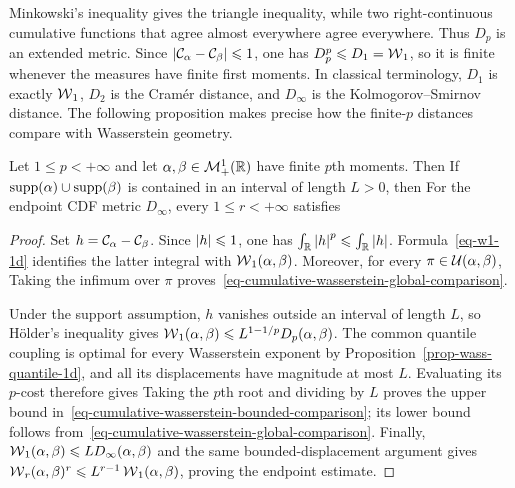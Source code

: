 Minkowski's inequality gives the triangle inequality, while two right-continuous cumulative functions that agree almost everywhere agree everywhere. Thus $D_p$ is an extended metric. Since $\left\lvert\mathcal{C}_{\alpha}-\mathcal{C}_{\beta}\right\rvert\leqslant1$, one has $D_p^p\leqslant D_1=\operatorname{\mathcal{W}}_1$, so it is finite whenever the measures have finite first moments. In classical terminology, $D_1$ is exactly $\operatorname{\mathcal{W}}_1$, $D_2$ is the Cram\'er distance, and $D_\infty$ is the Kolmogorov--Smirnov distance. The following proposition makes precise how the finite-$p$ distances compare with Wasserstein geometry.

\begin{prop}\label{prop-cumulative-wasserstein-comparison}
	Let $1\leq p<+\infty$ and let $\alpha,\beta\in\mathcal{M}_+^1(\mathbb{R})$ have finite $p$th moments. Then
	If $\operatorname{supp}(\alpha)\cup\operatorname{supp}(\beta)$ is contained in an interval of length $L>0$, then
	For the endpoint CDF metric $D_\infty$, every $1\leq r<+\infty$ satisfies
\end{prop}
\begin{proof}
	Set $h=\mathcal{C}_{\alpha}-\mathcal{C}_{\beta}$. Since $\left\lvert h\right\rvert\leqslant1$, one has $\int_{\mathbb{R}}\left\lvert h\right\rvert^p\leqslant\int_{\mathbb{R}}\left\lvert h\right\rvert$. Formula~\eqref{eq-w1-1d} identifies the latter integral with $\operatorname{\mathcal{W}}_1(\alpha,\beta)$. Moreover, for every $\pi\in\mathcal{U}(\alpha,\beta)$,
	Taking the infimum over $\pi$ proves~\eqref{eq-cumulative-wasserstein-global-comparison}.

	Under the support assumption, $h$ vanishes outside an interval of length $L$, so H\"older's inequality gives
	$\operatorname{\mathcal{W}}_1(\alpha,\beta)\leqslant L^{1-1/p}D_p(\alpha,\beta)$. The common quantile coupling is optimal for every Wasserstein exponent by Proposition~\ref{prop-wass-quantile-1d}, and all its displacements have magnitude at most $L$. Evaluating its $p$-cost therefore gives
	Taking the $p$th root and dividing by $L$ proves the upper bound in~\eqref{eq-cumulative-wasserstein-bounded-comparison}; its lower bound follows from~\eqref{eq-cumulative-wasserstein-global-comparison}. Finally, $\operatorname{\mathcal{W}}_1(\alpha,\beta)\leqslant L D_\infty(\alpha,\beta)$ and the same bounded-displacement argument gives $\operatorname{\mathcal{W}}_r(\alpha,\beta)^r\leqslant L^{r-1}\operatorname{\mathcal{W}}_1(\alpha,\beta)$, proving the endpoint estimate.
\end{proof}

